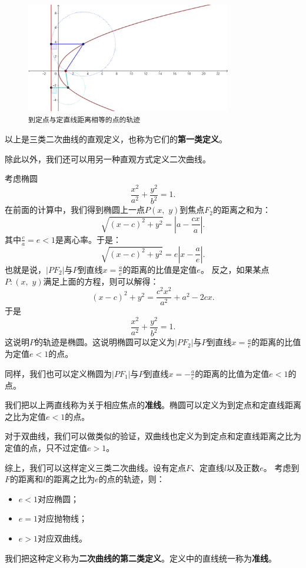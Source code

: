 \documentclass[12pt,UTF8]{ctexbook}
\begin{document}
\begin{figure}[h] 
    \centering
    \includegraphics[width=0.8\textwidth]{tu/抛物线第一定义.png}
    \caption*{\texttt{到定点与定直线距离相等的点的轨迹}}
\end{figure}

以上是三类二次曲线的直观定义，也称为它们的\textbf{第一类定义}。

除此以外，我们还可以用另一种直观方式定义二次曲线。

考虑椭圆
$$ \frac{x^2}{a^2} + \frac{y^2}{b^2} = 1.$$
在前面的计算中，我们得到椭圆上一点$P(x,\,\,y)$到焦点$F_2$的距离之和为：
$$ \sqrt{(x - c)^2 + y^2} = \left|a - \frac{cx}{a}\right|.$$
其中$\frac{c}{a} = e < 1$是离心率。于是：
$$  \sqrt{(x - c)^2 + y^2} = e\left|x - \frac{a}{e}\right| . $$
也就是说，$|PF_2|$与$P$到直线$x = \frac{a}{e}$的距离的比值是定值$e$。
反之，如果某点$P:(x,\,\,y)$满足上面的方程，则可以解得：
$$ (x - c)^2 + y^2 = \frac{c^2x^2}{a^2} + a^2 -2cx.$$
于是
$$ \frac{x^2}{a^2} + \frac{y^2}{b^2} = 1.$$
这说明$P$的轨迹是椭圆。这说明椭圆可以定义为$|PF_2|$与$P$到直线$x = \frac{a}{e}$的距离的比值为定值$e<1$的点。

同样，我们也可以定义椭圆为$|PF_1|$与$P$到直线$x = -\frac{a}{e}$的距离的比值为定值$e<1$的点。

我们把以上两直线称为关于相应焦点的\textbf{准线}。椭圆可以定义为到定点和定直线距离之比为定值$e<1$的点。

对于双曲线，我们可以做类似的验证，双曲线也定义为到定点和定直线距离之比为定值的点，只不过定值$e > 1$。

综上，我们可以这样定义三类二次曲线。设有定点$F$、定直线$l$以及正数$e$。
考虑到$F$的距离和$l$的距离之比为$e$的点的轨迹，则：
\begin{itemize}
    \item $e<1$对应椭圆；
    \item $e = 1$对应抛物线；
    \item $e >1$对应双曲线。
\end{itemize}
我们把这种定义称为\textbf{二次曲线的第二类定义}。定义中的直线统一称为\textbf{准线}。
\end{document}
